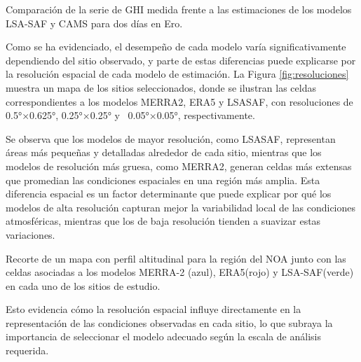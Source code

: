 \documentclass[letterpaper,12pt, twoside]{report}
\providecommand{\DIFdeltex}[1]{{\protect\color{red} \scriptsize #1}} %
\providecommand{\DIFdelFL}[1]{\DIFdel{#1}} %
\providecommand{\DIFdel}[1]{\texorpdfstring{\DIFdeltex{#1}}{}} %
\begin{document}
{%
\DIFdelFL{Comparación de la serie de GHI medida frente a las estimaciones de los modelos LSA-SAF y CAMS para dos días en Ero.}}

\DIFdel{Como se ha evidenciado, el desempeño de cada modelo varía significativamente dependiendo del sitio observado, y parte de estas diferencias puede explicarse por la resolución espacial de cada modelo de estimación. La Figura \ref{fig:resoluciones} muestra un mapa de los sitios seleccionados, donde se ilustran las celdas correspondientes a los modelos MERRA2, ERA5 y LSASAF, con resoluciones de 0.5°×0.625°, 0.25°×0.25° y ~0.05°×0.05°, respectivamente.}%

\DIFdel{Se observa que los modelos de mayor resolución, como LSASAF, representan áreas más pequeñas y detalladas alrededor de cada sitio, mientras que los modelos de resolución más gruesa, como MERRA2, generan celdas más extensas que promedian las condiciones espaciales en una región más amplia. Esta diferencia espacial es un factor determinante que puede explicar por qué los modelos de alta resolución capturan mejor la variabilidad local de las condiciones atmosféricas, mientras que los de baja resolución tienden a suavizar estas variaciones.}%

{%
\DIFdelFL{Recorte de un mapa con perfil altitudinal para la región del NOA junto con  las celdas asociadas a los modelos MERRA-2 (azul), ERA5(rojo) y LSA-SAF(verde) en cada uno de los sitios de estudio.}}

\DIFdel{Esto evidencia cómo la resolución espacial influye directamente en la representación de las condiciones observadas en cada sitio, lo que subraya la importancia de seleccionar el modelo adecuado según la escala de análisis requerida.
}%
\end{document}
